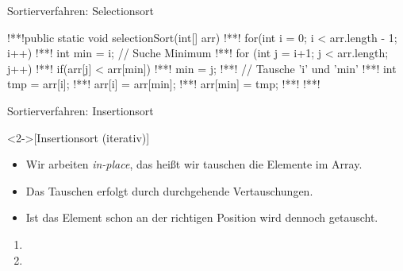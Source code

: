 \begin{frame}[fragile,c]{Sortierverfahren: Selectionsort}
    \begin{plainjava}
!**!public static void selectionSort(int[] arr) {
!**!    for(int i = 0; i < arr.length - 1; i++) {
!**!        int min = i; // Suche Minimum
!**!        for (int j = i+1; j < arr.length; j++)
!**!            if(arr[j] < arr[min])
!**!                min = j;
!**!        // Tausche 'i' und 'min'
!**!        int tmp = arr[i];
!**!        arr[i] = arr[min];
!**!        arr[min] = tmp;
!**!    }
!**!}
    \end{plainjava}
\end{frame}

\begin{frame}{Sortierverfahren: Insertionsort}
    \begin{definition}<2->[Insertionsort \hfill{}(iterativ)]
    \end{definition}
    \begin{itemize}[<+(1)->]
        \item Wir arbeiten \emph{in-place}, das heißt wir tauschen die Elemente im Array.
        \item Das Tauschen erfolgt durch durchgehende Vertauschungen.
        \item Ist das Element schon an der richtigen Position wird dennoch getauscht.
    \end{itemize}
    \vfill
    \begin{center}\pause
\begin{minipage}{0.9\linewidth}
\begin{multicols}{2}
    \begin{enumerate}[<+(1)->]
        \item {}
        \item \begin{tikzpicture}[scale=0.65,every node/.style={transform shape},baseline=-0.6ex]

\end{tikzpicture}
\end{enumerate}
\end{multicols}
\end{minipage}
\end{center}
\end{frame}
